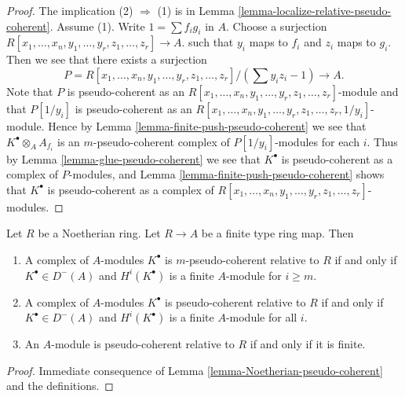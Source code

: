 \begin{proof}
The implication (2) $\Rightarrow$ (1) is in
Lemma \ref{lemma-localize-relative-pseudo-coherent}.
Assume (1). Write $1 = \sum f_ig_i$ in $A$.
Choose a surjection
$R[x_1, \ldots, x_n, y_1, \ldots, y_r, z_1, \ldots, z_r] \to A$.
such that $y_i$ maps to $f_i$ and $z_i$ maps to $g_i$. Then we
see that there exists a surjection
$$
P = R[x_1, \ldots, x_n, y_1, \ldots, y_r, z_1, \ldots, z_r]/(\sum y_iz_i - 1)
\longrightarrow
A.
$$
Note that $P$ is pseudo-coherent as an
$R[x_1, \ldots, x_n, y_1, \ldots, y_r, z_1, \ldots, z_r]$-module
and that $P[1/y_i]$ is pseudo-coherent as an
$R[x_1, \ldots, x_n, y_1, \ldots, y_r, z_1, \ldots, z_r, 1/y_i]$-module.
Hence by
Lemma \ref{lemma-finite-push-pseudo-coherent}
we see that
$K^\bullet \otimes_A A_{f_i}$ is an $m$-pseudo-coherent complex
of $P[1/y_i]$-modules for each $i$.
Thus by
Lemma \ref{lemma-glue-pseudo-coherent}
we see that $K^\bullet$ is pseudo-coherent as a complex of
$P$-modules, and
Lemma \ref{lemma-finite-push-pseudo-coherent}
shows that  $K^\bullet$ is pseudo-coherent as a complex of
$R[x_1, \ldots, x_n, y_1, \ldots, y_r, z_1, \ldots, z_r]$-modules.
\end{proof}

\begin{lemma}
\label{lemma-Noetherian-relative-pseudo-coherent}
Let $R$ be a Noetherian ring. Let $R \to A$ be a finite type ring map. Then
\begin{enumerate}
\item A complex of $A$-modules $K^\bullet$ is $m$-pseudo-coherent
relative to $R$ if and only if $K^\bullet \in D^{-}(A)$ and
$H^i(K^\bullet)$ is a finite $A$-module for $i \geq m$.
\item A complex of $A$-modules $K^\bullet$ is pseudo-coherent relative to $R$
if and only if $K^\bullet \in D^{-}(A)$ and
$H^i(K^\bullet)$ is a finite $A$-module for all $i$.
\item An $A$-module is pseudo-coherent relative to $R$
if and only if it is finite.
\end{enumerate}
\end{lemma}

\begin{proof}
Immediate consequence of
Lemma \ref{lemma-Noetherian-pseudo-coherent}
and the definitions.
\end{proof}










